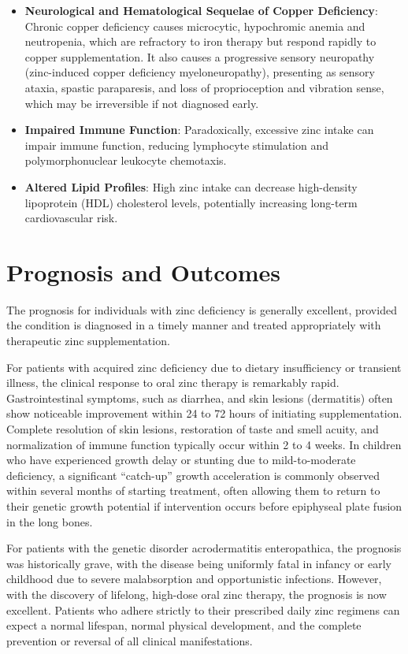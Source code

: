 \begin{itemize}
\begin{itemize}
        \item \textbf{Neurological and Hematological Sequelae of Copper Deficiency}: Chronic copper deficiency causes microcytic, hypochromic anemia and neutropenia, which are refractory to iron therapy but respond rapidly to copper supplementation. It also causes a progressive sensory neuropathy (zinc-induced copper deficiency myeloneuropathy), presenting as sensory ataxia, spastic paraparesis, and loss of proprioception and vibration sense, which may be irreversible if not diagnosed early.
        \item \textbf{Impaired Immune Function}: Paradoxically, excessive zinc intake can impair immune function, reducing lymphocyte stimulation and polymorphonuclear leukocyte chemotaxis.
        \item \textbf{Altered Lipid Profiles}: High zinc intake can decrease high-density lipoprotein (HDL) cholesterol levels, potentially increasing long-term cardiovascular risk.
    \end{itemize}
\end{itemize}

\section*{Prognosis and Outcomes}
The prognosis for individuals with zinc deficiency is generally excellent, provided the condition is diagnosed in a timely manner and treated appropriately with therapeutic zinc supplementation.

For patients with acquired zinc deficiency due to dietary insufficiency or transient illness, the clinical response to oral zinc therapy is remarkably rapid. Gastrointestinal symptoms, such as diarrhea, and skin lesions (dermatitis) often show noticeable improvement within 24 to 72 hours of initiating supplementation. Complete resolution of skin lesions, restoration of taste and smell acuity, and normalization of immune function typically occur within 2 to 4 weeks. In children who have experienced growth delay or stunting due to mild-to-moderate deficiency, a significant ``catch-up'' growth acceleration is commonly observed within several months of starting treatment, often allowing them to return to their genetic growth potential if intervention occurs before epiphyseal plate fusion in the long bones.

For patients with the genetic disorder acrodermatitis enteropathica, the prognosis was historically grave, with the disease being uniformly fatal in infancy or early childhood due to severe malabsorption and opportunistic infections. However, with the discovery of lifelong, high-dose oral zinc therapy, the prognosis is now excellent. Patients who adhere strictly to their prescribed daily zinc regimens can expect a normal lifespan, normal physical development, and the complete prevention or reversal of all clinical manifestations.

